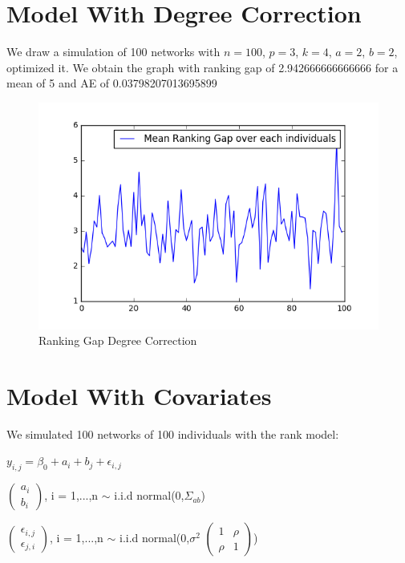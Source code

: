 \documentclass[12pt]{ociamthesis}  %
\begin{document}
	
	\section{Model With Degree Correction}
	
	We draw a simulation of 100 networks with $n = 100$, $ p = 3$, $k = 4$, $a = 2$, $b = 2$, optimized it. We obtain the graph with ranking gap of 2.942666666666666 for a mean of 5 and AE of 0.03798207013695899
	
	\begin{figure}
		\centering
		\includegraphics[width=\textwidth,height=\textheight,keepaspectratio]{SimulationGapDegreeCorr}
		\caption{Ranking Gap Degree Correction}
		\label{label-image14}
	\end{figure}
	
	
	\section{Model With Covariates}
	
	We simulated 100 networks of 100 individuals with the rank model:
	
	$y_{i,j} = \beta_{0} + a_{i} + b_{j} + \epsilon_{i,j}$
	
	
	\(
	\begin{pmatrix}
	a_{i} \\
	b_{i}
	\end{pmatrix}
	\), i = 1,...,n $\sim $ i.i.d normal(0,$\Sigma_{ab}$)
	
	\(
	\begin{pmatrix}
	\epsilon_{i,j} \\
	\epsilon_{j,i}
	\end{pmatrix}
	\), i = 1,...,n $\sim $ i.i.d normal(0,$\sigma^{2}$ $\begin{pmatrix} 1 & \rho \\ \rho & 1 \end{pmatrix}$)
	
\end{document}
